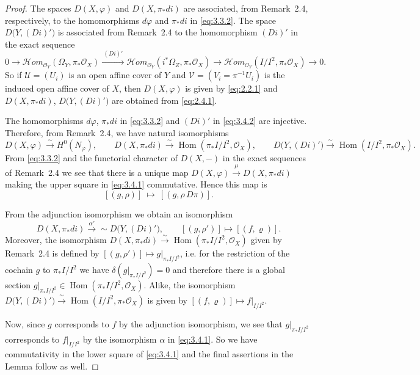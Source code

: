 \documentclass[11pt,twoside]{amsart}
\theoremstyle{plain}
\numberwithin{equation}{section}
\theoremstyle{definition}
\begin{document}
\begin{proof}
The spaces \(D(X,\varphi)\) and \(D(X,\pi_{*}d i)\) are associated, from Remark~2.4, respectively,
to the homomorphisms \(d\varphi\) and \(\pi_{*}d i\) in \eqref{eq:3.3.2}. The space
\(D\bigl(Y,(D i)'\bigr)\) is associated from Remark~2.4 to the homomorphism \((D i)'\) in the
exact sequence
\begin{equation}\label{eq:3.4.2}
0 \to \mathcal{H}om_{\mathcal O_Y}(\Omega_Y,\pi_{*}\mathcal O_X)
\xrightarrow{\ (D i)'\ }
\mathcal{H}om_{\mathcal O_Y}(i^{*}\Omega_Z,\pi_{*}\mathcal O_X)
\to
\mathcal{H}om_{\mathcal O_Y}(I/I^{2},\pi_{*}\mathcal O_X)
\to 0.
\end{equation}
So if \(\mathcal U=(U_i)\) is an open affine cover of \(Y\) and \(\mathcal V=(V_i=\pi^{-1}U_i)\) is
the induced open affine cover of \(X\), then \(D(X,\varphi)\) is given by \eqref{eq:2.2.1} and
\(D(X,\pi_{*}d i)\), \(D\bigl(Y,(D i)'\bigr)\) are obtained from \eqref{eq:2.4.1}.

The homomorphisms \(d\varphi\), \(\pi_{*}d i\) in \eqref{eq:3.3.2} and \((D i)'\) in \eqref{eq:3.4.2}
are injective. Therefore, from Remark~2.4, we have natural isomorphisms
\[
D(X,\varphi)\xrightarrow{\ \sim\ } H^{0}(N_{\varphi}),\qquad
D(X,\pi_{*}d i)\xrightarrow{\ \sim\ }\operatorname{Hom}(\pi_{*}I/I^{2},\mathcal O_X),\qquad
D\bigl(Y,(D i)'\bigr)\xrightarrow{\ \sim\ }\operatorname{Hom}(I/I^{2},\pi_{*}\mathcal O_X).
\]
From \eqref{eq:3.3.2} and the functorial character of \(D(X,-)\) in the exact sequences of
Remark~2.4 we see that there is a unique map \(D(X,\varphi)\xrightarrow{\ \mu\ }D(X,\pi_{*}d i)\)
making the upper square in \eqref{eq:3.4.1} commutative. Hence this map is
\[
[(g,\rho)] \ \longmapsto\ [(g,\rho\,D\pi)].
\]

From the adjunction isomorphism we obtain an isomorphism
\begin{equation}\label{eq:3.4.3}
D(X,\pi_{*}d i)\xrightarrow{\ \alpha'\ }\sim D\bigl(Y,(D i)'\bigr),
\qquad
[(g,\rho')] \longmapsto [(f,\varrho)].
\end{equation}
Moreover, the isomorphism \(D(X,\pi_{*}d i)\xrightarrow{\ \sim\ }
\operatorname{Hom}(\pi_{*}I/I^{2},\mathcal O_X)\) given by Remark~2.4 is defined by
\(
[(g,\rho')]\mapsto g|_{\pi_{*}I/I^{2}}
\),
i.e. for the restriction of the cochain \(g\) to \(\pi_{*}I/I^{2}\) we have
\(\delta(g|_{\pi_{*}I/I^{2}})=0\) and therefore there is a global section
\(g|_{\pi_{*}I/I^{2}}\in \operatorname{Hom}(\pi_{*}I/I^{2},\mathcal O_X)\).
Alike, the isomorphism \(D\bigl(Y,(D i)'\bigr)\xrightarrow{\ \sim\ }
\operatorname{Hom}(I/I^{2},\pi_{*}\mathcal O_X)\) is given by
\(
[(f,\varrho)]\mapsto f|_{I/I^{2}}.
\)

Now, since \(g\) corresponds to \(f\) by the adjunction isomorphism, we see that
\(g|_{\pi_{*}I/I^{2}}\) corresponds to \(f|_{I/I^{2}}\) by the isomorphism \(\alpha\) in \eqref{eq:3.4.1}.
So we have commutativity in the lower square of \eqref{eq:3.4.1} and the final assertions in the
Lemma follow as well.
\end{proof}
\end{document}
